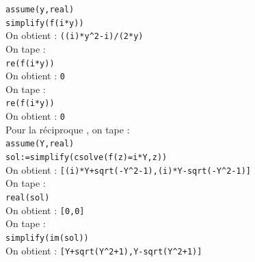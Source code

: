 \documentclass[a4paper,11pt]{book}
\begin{document}
\begin{itemize}
{\tt assume(y,real)}\\
{\tt simplify(f(i*y))}\\
On obtient : 
{\tt ((i)*y\verb|^|2-i)/(2*y)}\\
On tape :\\
{\tt re(f(i*y))}\\
On obtient : {\tt 0}\\ 
On tape :\\
{\tt re(f(i*y))}\\
On obtient : {\tt 0}\\ 
Pour la r\'eciproque , on tape :\\
{\tt assume(Y,real)}\\
{\tt sol:=simplify(csolve(f(z)=i*Y,z))}\\
On obtient : 
{\tt [(i)*Y+sqrt(-Y\verb|^|2-1),(i)*Y-sqrt(-Y\verb|^|2-1)]}\\
On tape :\\
{\tt real(sol)}\\
On obtient : {\tt [0,0]}\\
On tape :\\
{\tt simplify(im(sol))}\\
On obtient : {\tt [Y+sqrt(Y\verb|^|2+1),Y-sqrt(Y\verb|^|2+1)]}\\


\end{itemize}
\end{document}
